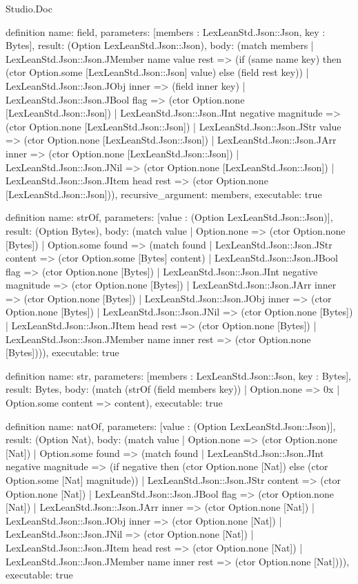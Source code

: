 \begin{lexlean}{Studio.Doc}
\begin{semanticmodule}
definition{
  name: field,
  parameters: [members : LexLeanStd.Json::Json, key : Bytes],
  result: (Option LexLeanStd.Json::Json),
  body: (match members
    | LexLeanStd.Json::Json.JMember name value rest => (if (same name key) then (ctor Option.some [LexLeanStd.Json::Json] value) else (field rest key))
    | LexLeanStd.Json::Json.JObj inner => (field inner key)
    | LexLeanStd.Json::Json.JBool flag => (ctor Option.none [LexLeanStd.Json::Json])
    | LexLeanStd.Json::Json.JInt negative magnitude => (ctor Option.none [LexLeanStd.Json::Json])
    | LexLeanStd.Json::Json.JStr value => (ctor Option.none [LexLeanStd.Json::Json])
    | LexLeanStd.Json::Json.JArr inner => (ctor Option.none [LexLeanStd.Json::Json])
    | LexLeanStd.Json::Json.JNil => (ctor Option.none [LexLeanStd.Json::Json])
    | LexLeanStd.Json::Json.JItem head rest => (ctor Option.none [LexLeanStd.Json::Json])),
  recursive_argument: members,
  executable: true
}

definition{
  name: strOf,
  parameters: [value : (Option LexLeanStd.Json::Json)],
  result: (Option Bytes),
  body: (match value
    | Option.none => (ctor Option.none [Bytes])
    | Option.some found => (match found
      | LexLeanStd.Json::Json.JStr content => (ctor Option.some [Bytes] content)
      | LexLeanStd.Json::Json.JBool flag => (ctor Option.none [Bytes])
      | LexLeanStd.Json::Json.JInt negative magnitude => (ctor Option.none [Bytes])
      | LexLeanStd.Json::Json.JArr inner => (ctor Option.none [Bytes])
      | LexLeanStd.Json::Json.JObj inner => (ctor Option.none [Bytes])
      | LexLeanStd.Json::Json.JNil => (ctor Option.none [Bytes])
      | LexLeanStd.Json::Json.JItem head rest => (ctor Option.none [Bytes])
      | LexLeanStd.Json::Json.JMember name inner rest => (ctor Option.none [Bytes]))),
  executable: true
}

definition{
  name: str,
  parameters: [members : LexLeanStd.Json::Json, key : Bytes],
  result: Bytes,
  body: (match (strOf (field members key))
    | Option.none => 0x
    | Option.some content => content),
  executable: true
}

definition{
  name: natOf,
  parameters: [value : (Option LexLeanStd.Json::Json)],
  result: (Option Nat),
  body: (match value
    | Option.none => (ctor Option.none [Nat])
    | Option.some found => (match found
      | LexLeanStd.Json::Json.JInt negative magnitude => (if negative then (ctor Option.none [Nat]) else (ctor Option.some [Nat] magnitude))
      | LexLeanStd.Json::Json.JStr content => (ctor Option.none [Nat])
      | LexLeanStd.Json::Json.JBool flag => (ctor Option.none [Nat])
      | LexLeanStd.Json::Json.JArr inner => (ctor Option.none [Nat])
      | LexLeanStd.Json::Json.JObj inner => (ctor Option.none [Nat])
      | LexLeanStd.Json::Json.JNil => (ctor Option.none [Nat])
      | LexLeanStd.Json::Json.JItem head rest => (ctor Option.none [Nat])
      | LexLeanStd.Json::Json.JMember name inner rest => (ctor Option.none [Nat]))),
  executable: true
}


\end{semanticmodule}
\end{lexlean}
